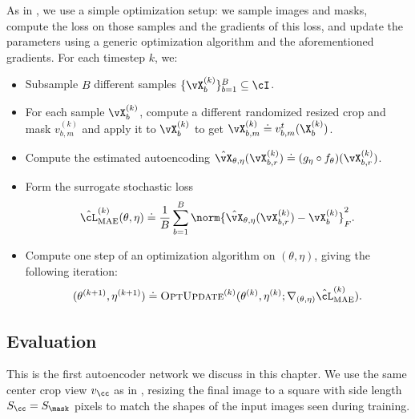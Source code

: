 \documentclass[../../book-main.tex]{subfiles}
\begin{document}
As in , we use a simple
optimization setup: we sample images and masks, compute the loss on
those samples and the gradients of this loss, and update the
parameters using a generic optimization algorithm and the
aforementioned gradients. For each timestep \(k\), we:
\begin{itemize}
\item Subsample \(B\) different samples \(\{\vX_{b}^{(k)}\}_{b =
    1}^{B} \subseteq \cI\).
\item For each sample \(\vX_{b}^{(k)}\), compute a different
    randomized resized crop and mask \(v_{b, m}^{(k)}\) and apply it
    to \(\vX_{b}^{(k)}\) to get \(\vX_{b, m}^{(k)} \doteq v_{b,
    m}^{t}(\X_{b}^{(k)})\).
\item Compute the estimated autoencoding \(\hat{\vX}_{\theta,
        \eta}(\vX_{b, r}^{(k)}) \doteq (g_{\eta} \circ
    f_{\theta})(\vX_{b, r}^{(k)})\).
\item Form the surrogate stochastic loss
    \begin{equation}
        \hat{\cL}_{\mathrm{MAE}}^{(k)}(\theta, \eta) \doteq
        \frac{1}{B}\sum_{b = 1}^{B}\norm{\hat{\vX}_{\theta,
        \eta}(\vX_{b, r}^{(k)}) - \vX_{b}^{(k)}}_{F}^{2}.
    \end{equation}
\item Compute one step of an optimization algorithm on \((\theta,
    \eta)\), giving the following iteration:
    \begin{equation}
        (\theta^{(k + 1)}, \eta^{(k + 1)}) \doteq
        \textsc{OptUpdate}^{(k)}(\theta^{(k)}, \eta^{(k)};
        \nabla_{(\theta, \eta)}\hat{\cL}_{\mathrm{MAE}}^{(k)}).
    \end{equation}
\end{itemize}

\subsection{Evaluation} \label{sub:image_completion_optimization_1}

This is the first autoencoder network we discuss in this chapter. We
use the same center crop view \(v_{\cc}\) as in
,
resizing the final image to a square with side length \(S_{\cc} =
S_{\mask}\) pixels to match the shapes of the input images seen during training.
\end{document}
